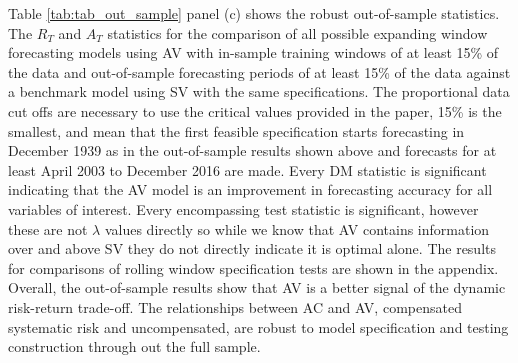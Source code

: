 Table \ref{tab:tab_out_sample} panel (c) shows the robust out-of-sample statistics. The $R_{T}$ and $A_{T}$ statistics for the comparison of all possible expanding window forecasting models using AV with in-sample training windows of at least 15\% of the data and out-of-sample forecasting periods of at least 15\% of the data against a benchmark model using SV with the same specifications. The proportional data cut offs are necessary to use the critical values provided in the \citet{rossi_out--sample_2012} paper, 15\% is the smallest, and mean that the first feasible specification starts forecasting in December 1939 as in the out-of-sample results shown above and forecasts for at least April 2003 to December 2016 are made. Every DM statistic is significant indicating that the AV model is an improvement in forecasting accuracy for all variables of interest. Every encompassing test statistic is significant, however these are not $\lambda$ values directly so while we know that AV contains information over and above SV they do not directly indicate it is optimal alone. The results for comparisons of rolling window specification tests are shown in the appendix. Overall, the out-of-sample results show that AV is a better signal of the dynamic risk-return trade-off. The relationships between AC and AV, compensated systematic risk and uncompensated, are robust to model specification and testing construction through out the full sample.

